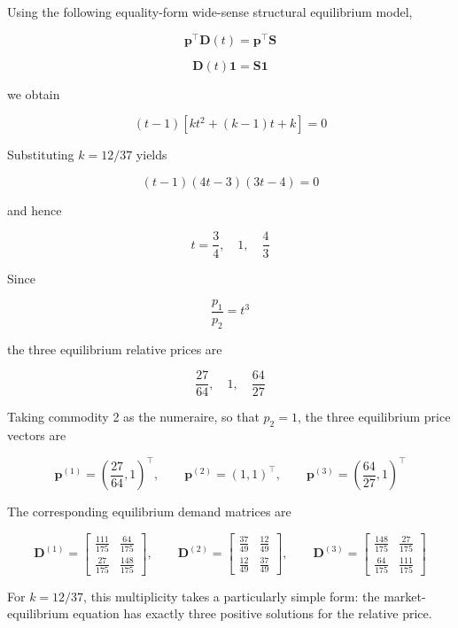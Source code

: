 \documentclass[
  letterpaper,
  DIV=11,
  numbers=noendperiod]{scrreprt}
\begin{document}
Using the following equality-form wide-sense structural equilibrium
model,

\[
\mathbf p^\top\mathbf D(t)=\mathbf p^\top\mathbf S
\]

\[
\mathbf D(t)\mathbf 1=\mathbf S\mathbf 1
\]

we obtain

\[
(t-1)[kt^2+(k-1)t+k]=0
\]

Substituting \(k=12/37\) yields

\[
(t-1)(4t-3)(3t-4)=0
\]

and hence

\[
t=\frac{3}{4},\quad 1,\quad \frac{4}{3}
\]

Since

\[
\frac{p_1}{p_2}=t^3
\]

the three equilibrium relative prices are

\[
\frac{27}{64},\quad 1,\quad \frac{64}{27}
\]

Taking commodity 2 as the numeraire, so that \(p_2=1\), the three
equilibrium price vectors are

\[
\mathbf p^{(1)}=\left(\frac{27}{64},1\right)^\top,\qquad
\mathbf p^{(2)}=(1,1)^\top,\qquad
\mathbf p^{(3)}=\left(\frac{64}{27},1\right)^\top
\]

The corresponding equilibrium demand matrices are

\[
\mathbf D^{(1)}
=
\begin{bmatrix}
\frac{111}{175} & \frac{64}{175}\\
\frac{27}{175} & \frac{148}{175}
\end{bmatrix},
\qquad
\mathbf D^{(2)}
=
\begin{bmatrix}
\frac{37}{49} & \frac{12}{49}\\
\frac{12}{49} & \frac{37}{49}
\end{bmatrix},
\qquad
\mathbf D^{(3)}
=
\begin{bmatrix}
\frac{148}{175} & \frac{27}{175}\\
\frac{64}{175} & \frac{111}{175}
\end{bmatrix}
\]

For \(k=12/37\), this multiplicity takes a particularly simple form: the
market-equilibrium equation has exactly three positive solutions for the
relative price.
\end{document}
